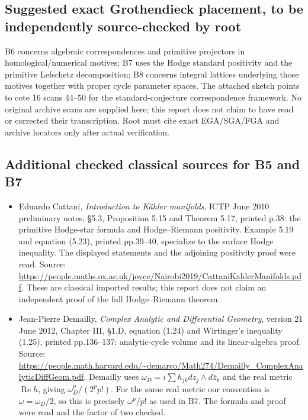 \documentclass[11pt,a4paper]{article}
\providecommand{\tightlist}{\setlength{\itemsep}{0pt}\setlength{\parskip}{0pt}}
\theoremstyle{definition}
\begin{document}
\subsection{Suggested exact Grothendieck placement, to be independently source-checked by root}\label{suggested-exact-grothendieck-placement-to-be-independently-source-checked-by-root}

B6 concerns algebraic correspondences and primitive projectors in homological/numerical motives; B7 uses the Hodge standard positivity and the primitive Lefschetz decomposition; B8 concerns integral lattices underlying those motives together with proper cycle parameter spaces. The attached sketch points to cote 16 scans 44--50 for the standard-conjecture correspondence framework. No original archive scans are supplied here; this report does not claim to have read or corrected their transcription. Root must cite exact EGA/SGA/FGA and archive locators only after actual verification.

\subsection{Additional checked classical sources for B5 and B7}\label{additional-checked-classical-sources-for-b5-and-b7}

\begin{itemize}
\tightlist
\item
  Eduardo Cattani, \emph{Introduction to Kähler manifolds}, ICTP June 2010 preliminary notes, §5.3, Proposition 5.15 and Theorem 5.17, printed p.38: the primitive Hodge-star formula and Hodge--Riemann positivity. Example 5.19 and equation (5.23), printed pp.39--40, specialize to the surface Hodge inequality. The displayed statements and the adjoining positivity proof were read. Source: \url{https://people.maths.ox.ac.uk/joyce/Nairobi2019/CattaniKahlerManifolds.pdf}. These are classical imported results; this report does not claim an independent proof of the full Hodge--Riemann theorem.
\item
  Jean-Pierre Demailly, \emph{Complex Analytic and Differential Geometry}, version 21 June 2012, Chapter III, §1.D, equation (1.24) and Wirtinger's inequality (1.25), printed pp.136--137: analytic-cycle volume and its linear-algebra proof. Source: \url{https://people.math.harvard.edu/~demarco/Math274/Demailly_ComplexAnalyticDiffGeom.pdf}. Demailly uses \(\omega_D=i\sum h_{jk}dz_j\wedge d\bar z_k\) and the real metric \(\operatorname{Re}h\), giving \(\omega_D^p/(2^p p!)\). For the same real metric our convention is \(\omega=\omega_D/2\), so this is precisely \(\omega^p/p!\) as used in B7. The formula and proof were read and the factor of two checked.
\end{itemize}
\end{document}
